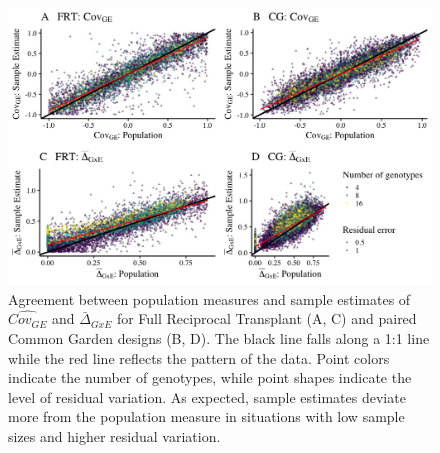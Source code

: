 \documentclass[11pt, oneside]{amsart}
\begin{document}
\renewcommand\thefigure{S3}
\begin{figure}[h]
\begin{center}
\includegraphics[width=6in]{Figs/SampleVsPopulation.jpeg}
\end{center}
\label{Fig: Population vs. Sample Estimates}
\caption[Agreement between population measures and sample estimates of  $\hat{Cov_{GE}}$ and $\bar\Delta_{GxE}$ for Full Reciprocal Transplant (A, C) and paired Common Garden designs (B, D). ]{Agreement between population measures and sample estimates of  $\hat{Cov_{GE}}$ and $\bar\Delta_{GxE}$ for Full Reciprocal Transplant (A, C) and paired Common Garden designs (B, D). The black line falls along a 1:1 line while the red line reflects the pattern of the data. Point colors indicate the number of genotypes, while point shapes indicate the level of residual variation. As expected, sample estimates deviate more from the population measure in situations with low sample sizes and higher residual variation.}
\end{figure}
\end{document}
